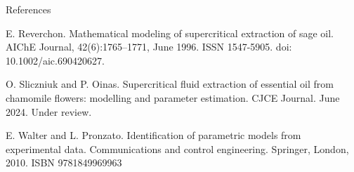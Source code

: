 \documentclass[a0,portrait]{a0poster}
\begin{document}
\begin{multicols}{2}
\begin{tcolorbox}[width=\linewidth, boxrule=0mm, sharp corners=all, colback=white]
	{\LARGE References\\}
	\begin{enumerate}[label={[\arabic*]}]
		\item E. Reverchon. Mathematical modeling of supercritical extraction of sage oil. AIChE Journal, 42(6):1765–1771, June 1996. ISSN 1547-5905. doi: 10.1002/aic.690420627.
		\item O. Sliczniuk and P. Oinas. Supercritical fluid extraction of essential oil from chamomile flowers: modelling and parameter estimation. CJCE Journal. June 2024. Under review.
		\item E. Walter and L. Pronzato. Identification of parametric models from experimental data. Communications and control engineering. Springer, London, 2010. ISBN 9781849969963
	\end{enumerate}
\end{tcolorbox}




\end{multicols}
\end{document}
